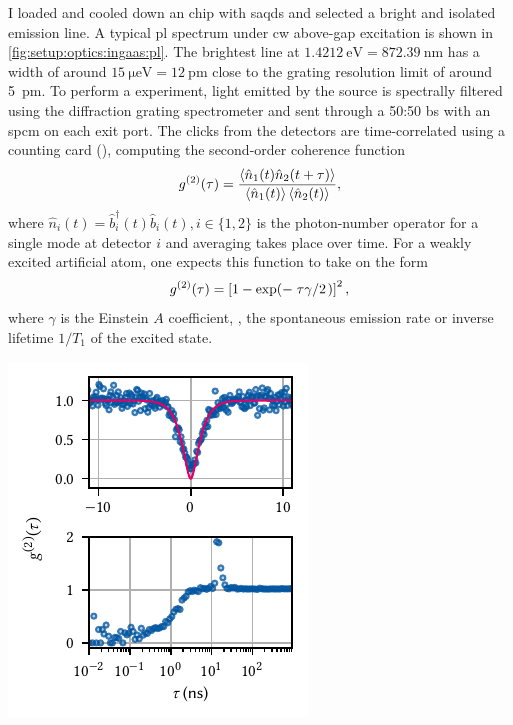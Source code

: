 I loaded and cooled down an  chip with \glspl{saqd} and selected a bright and isolated emission line.
A typical \gls{pl} spectrum under \gls{cw} above-gap excitation is shown in \cref{fig:setup:optics:ingaas:pl}.
The brightest line at $\qty{1.4212}{\eV} = \qty{872.39}{\nano\meter}$ has a width of around $\qty{15}{\micro\eV} = \qty{12}{\pico\meter}$ close to the grating
resolution limit of around \qty{5}{pm}.
To perform a  experiment, light emitted by the source is spectrally filtered using the \thespectrometer diffraction grating spectrometer and sent through a 50:50 \gls{bs} with an \thespcm \gls{spcm} on each exit port.
The clicks from the detectors are time-correlated using a counting card (\tagger), computing the second-order coherence function~\cite{Kimble1976,Walls1979,Cohen-Tannoudji1998}
\begin{equation}
    g^{(2)}(\tau) = \frac{\expval{\hat{n}_1(t)\hat{n}_2(t + \tau)}}{\expval{\hat{n}_1(t)}\expval{\hat{n}_2(t)}},
\end{equation}
where $\hat{n}_i(t) = \hat{b}^\dagger_i(t) \hat{b}_i(t), i\in\lbrace 1,2\rbrace$ is the photon-number operator for a single mode at detector $i$ and averaging takes place over time.
For a weakly excited artificial atom, one expects this function to take on the form~\cite{Walls1979}
\begin{equation}\label{eq:setup:optics:g2:fit}
    \g{2}(\tau) = \left[1 - \exp(-\flatfrac{\tau\gamma}{2})\right]^2,
\end{equation}
where $\gamma$ is the Einstein $A$ coefficient, \ie, the spontaneous emission rate or inverse lifetime $1/T_1$ of the excited state.

\begin{marginfigure}
    \centering
    \includegraphics{img/pdf/setup/ingaas_g2}
    \caption[]{
         measurement of the emission line at \qty{872.267}{\nano\meter} under \gls{cw} excitation with \qty{1}{\micro\watt} at \qty{793}{\nano\meter}.
        The monochromator bandwidth was $\Delta\lambda = \qty{200}{\pico\meter} = \qty{325}{\micro\eV}$.
    }
    \label{fig:setup:optics:ingaas:g2}
\end{marginfigure}

